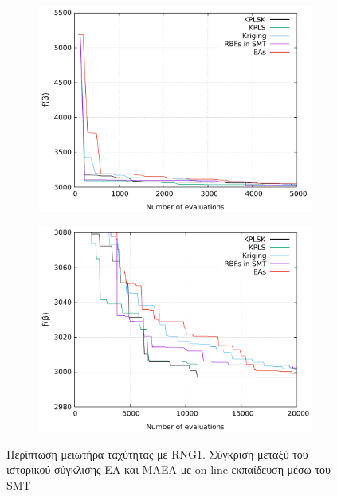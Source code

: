 \documentclass[twoside, 12pt,notitlepage]{report}
\begin{document}
\begin{enumerate}
\begin{figure}[h!]
\centering
	\begin{subfigure}[b]{0.47\textwidth}
	\centering
	\includegraphics[width=\textwidth, height=0.77\textwidth, 
	scale=1]{speed_reducer_online_comparison.pdf}   
	\end{subfigure}
	\hfill
	\begin{subfigure}[b]{0.47\textwidth}
	\centering
	\includegraphics[width=\textwidth, height=0.77\textwidth, 
	scale=1]{speed_reducer_online_comparison2.pdf}   
	\end{subfigure}
\caption{Περίπτωση μειωτήρα ταχύτητας με RNG1. Σύγκριση μεταξύ του 
ιστορικού σύγκλισης EA και ΜΑΕΑ με on-line εκπαίδευση μέσω του 
SMT} 
\end{figure}


\end{enumerate}
\end{document}
